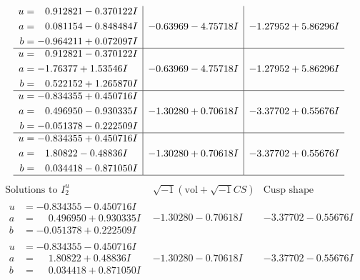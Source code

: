 \documentclass[1p]{elsarticle_modified}
\theoremstyle{definition}
\newcommand{\I}{\sqrt{-1}}
\begin{document}
$$\begin{array}{c|c|c}
\begin{aligned}
u &= \phantom{-}0.912821 - 0.370122 I \\
a &= \phantom{-}0.081154 - 0.848484 I \\
b &= -0.964211 + 0.072097 I\end{aligned}
 & -0.63969 - 4.75718 I & -1.27952 + 5.86296 I \\ \hline\begin{aligned}
u &= \phantom{-}0.912821 - 0.370122 I \\
a &= -1.76377 + 1.53546 I \\
b &= \phantom{-}0.522152 + 1.265870 I\end{aligned}
 & -0.63969 - 4.75718 I & -1.27952 + 5.86296 I \\ \hline\begin{aligned}
u &= -0.834355 + 0.450716 I \\
a &= \phantom{-}0.496950 - 0.930335 I \\
b &= -0.051378 - 0.222509 I\end{aligned}
 & -1.30280 + 0.70618 I & -3.37702 + 0.55676 I \\ \hline\begin{aligned}
u &= -0.834355 + 0.450716 I \\
a &= \phantom{-}1.80822 - 0.48836 I \\
b &= \phantom{-}0.034418 - 0.871050 I\end{aligned}
 & -1.30280 + 0.70618 I & -3.37702 + 0.55676 I\\
 \hline 
 \end{array}$$\newpage$$\begin{array}{c|c|c}  
\text{Solutions to }I^u_{2}& \I (\text{vol} + \sqrt{-1}CS) & \text{Cusp shape}\\
 \hline 
\begin{aligned}
u &= -0.834355 - 0.450716 I \\
a &= \phantom{-}0.496950 + 0.930335 I \\
b &= -0.051378 + 0.222509 I\end{aligned}
 & -1.30280 - 0.70618 I & -3.37702 - 0.55676 I \\ \hline\begin{aligned}
u &= -0.834355 - 0.450716 I \\
a &= \phantom{-}1.80822 + 0.48836 I \\
b &= \phantom{-}0.034418 + 0.871050 I\end{aligned}
 & -1.30280 - 0.70618 I & -3.37702 - 0.55676 I \\ \hline\begin{aligned}

\end{aligned}
\end{array}$$
\end{document}
